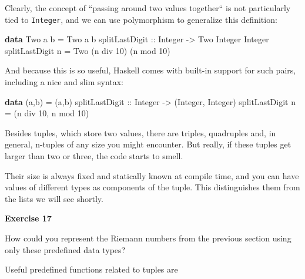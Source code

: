 \documentclass[11pt,
  american,
  DIV13]{article}
\newenvironment{Shaded}{}{}
\newcommand{\DataTypeTok}[1]{\textcolor[rgb]{0.56,0.13,0.00}{#1}}
\newcommand{\DecValTok}[1]{\textcolor[rgb]{0.25,0.63,0.44}{#1}}
\newcommand{\KeywordTok}[1]{\textcolor[rgb]{0.00,0.44,0.13}{\textbf{#1}}}
\newcommand{\NormalTok}[1]{#1}
\newcommand{\OtherTok}[1]{\textcolor[rgb]{0.00,0.44,0.13}{#1}}
\begin{document}
Clearly, the concept of ``passing around two values together`` is not
particularly tied to \texttt{Integer}, and we can use polymorphism to
generalize this definition:

\begin{Shaded}
\begin{Highlighting}[]
\KeywordTok{data} \DataTypeTok{Two}\NormalTok{ a b }\OtherTok{=} \DataTypeTok{Two}\NormalTok{ a b}
\OtherTok{splitLastDigit ::} \DataTypeTok{Integer} \OtherTok{{-}\textgreater{}} \DataTypeTok{Two} \DataTypeTok{Integer} \DataTypeTok{Integer}
\NormalTok{splitLastDigit n }\OtherTok{=} \DataTypeTok{Two}\NormalTok{ (n }\OtherTok{\textasciigrave{}div\textasciigrave{}} \DecValTok{10}\NormalTok{) (n }\OtherTok{\textasciigrave{}mod\textasciigrave{}} \DecValTok{10}\NormalTok{)}
\end{Highlighting}
\end{Shaded}

And because this is so useful, Haskell comes with built-in support for
such pairs, including a nice and slim syntax:

\begin{Shaded}
\begin{Highlighting}[]
\KeywordTok{data}\NormalTok{ (a,b) }\OtherTok{=}\NormalTok{ (a,b)}
\OtherTok{splitLastDigit ::} \DataTypeTok{Integer} \OtherTok{{-}\textgreater{}}\NormalTok{ (}\DataTypeTok{Integer}\NormalTok{, }\DataTypeTok{Integer}\NormalTok{)}
\NormalTok{splitLastDigit n }\OtherTok{=}\NormalTok{ (n }\OtherTok{\textasciigrave{}div\textasciigrave{}} \DecValTok{10}\NormalTok{, n }\OtherTok{\textasciigrave{}mod\textasciigrave{}} \DecValTok{10}\NormalTok{)}
\end{Highlighting}
\end{Shaded}

Besides tuples, which store two values, there are triples, quadruples
and, in general, n-tuples of any size you might encounter. But really,
if these tuples get larger than two or three, the code starts to smell.

Their size is always fixed and statically known at compile time, and you
can have values of different types as components of the tuple. This
distinguishes them from the lists we will see shortly.

\textbf{Exercise 17}

How could you represent the Riemann numbers from the previous section
using only these predefined data types?

Useful predefined functions related to tuples are
\end{document}
